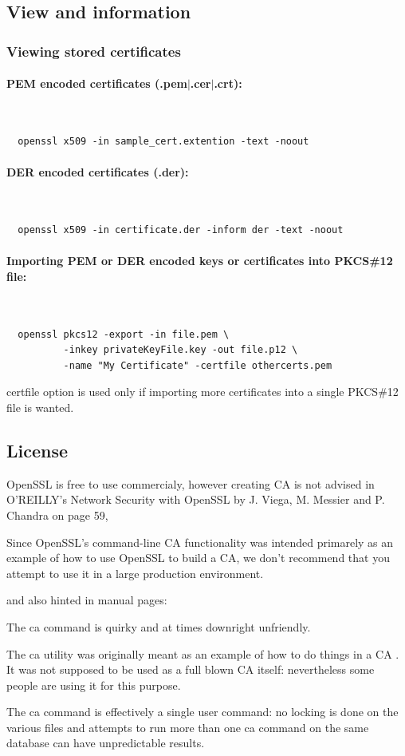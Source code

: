 \documentclass[10pt, a4paper]{report}
\newcommand{\myparagraph}[1]{\paragraph{#1}\mbox{}\\} %
\begin{document}
  \subsection{View and information}
  
\subsubsection{Viewing stored certificates}
\myparagraph{PEM encoded certificates (.pem$\vert$.cer$\vert$.crt):}
  \begin{verbatim}
  openssl x509 -in sample_cert.extention -text -noout
  \end{verbatim}
\myparagraph{DER encoded certificates (.der):}
  \begin{verbatim}
  openssl x509 -in certificate.der -inform der -text -noout
  \end{verbatim}
\myparagraph{Importing PEM or DER encoded keys or certificates into PKCS\#12 file:}
  \begin{verbatim}
  openssl pkcs12 -export -in file.pem \
          -inkey privateKeyFile.key -out file.p12 \
          -name "My Certificate" -certfile othercerts.pem
  \end{verbatim}
certfile option is used only if importing more certificates into a single PKCS\#12 file is wanted.

  
  \subsection{License}
OpenSSL is free to use commercialy, however creating CA is not advised in O'REILLY's Network Security with OpenSSL by J. Viega, M. Messier and P. Chandra on page 59,
\begin{displayquote}
Since OpenSSL's command-line CA functionality was intended primarely as an example of how to use OpenSSL to build a CA, we don't recommend that you attempt to use it in a large production environment.
\end{displayquote}
and also hinted in manual pages:
\begin{displayquote}
The ca command is quirky and at times downright unfriendly.

The ca utility was originally meant as an example of how to do things in a CA . It was not supposed to be used as a full blown CA itself: nevertheless some people are using it for this purpose.

The ca command is effectively a single user command: no locking is done on the various files and attempts to run more than one ca command on the same database can have unpredictable results. 
\end{displayquote}
  
\end{document}
